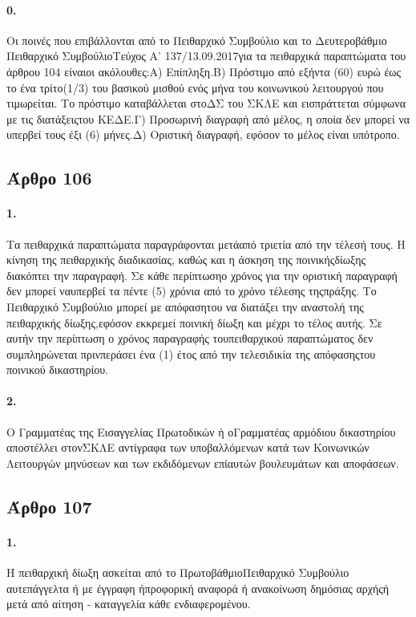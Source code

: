 \documentclass[a4paper,oneside, 10pt]{book}
\begin{document}
\paragraph { 0. } Οι ποινές που επιβάλλονται από το Πειθαρχικό Συμβούλιο και το Δευτεροβάθμιο Πειθαρχικό ΣυμβούλιοΤεύχος Α’ 137/13.09.2017για τα πειθαρχικά παραπτώματα του άρθρου 104 είναιοι ακόλουθες:Α) Επίπληξη.Β) Πρόστιμο από εξήντα (60) ευρώ έως το ένα τρίτο(1/3) του βασικού μισθού ενός μήνα του κοινωνικού λειτουργού που τιμωρείται. Το πρόστιμο καταβάλλεται στοΔΣ του ΣΚΛΕ και εισπράττεται σύμφωνα με τις διατάξειςτου ΚΕΔΕ.Γ) Προσωρινή διαγραφή από μέλος, η οποία δεν μπορεί να υπερβεί τους έξι (6) μήνες.Δ) Οριστική διαγραφή, εφόσον το μέλος είναι υπότροπο.
\subsection*{ Άρθρο 106 }
\paragraph { 1. } Τα πειθαρχικά παραπτώματα παραγράφονται μετάαπό τριετία από την τέλεσή τους. Η κίνηση της πειθαρχικής διαδικασίας, καθώς και η άσκηση της ποινικήςδίωξης διακόπτει την παραγραφή. Σε κάθε περίπτωσηο χρόνος για την οριστική παραγραφή δεν μπορεί ναυπερβεί τα πέντε (5) χρόνια από το χρόνο τέλεσης τηςπράξης. Το Πειθαρχικό Συμβούλιο μπορεί με απόφασητου να διατάξει την αναστολή της πειθαρχικής δίωξης,εφόσον εκκρεμεί ποινική δίωξη και μέχρι το τέλος αυτής. Σε αυτήν την περίπτωση ο χρόνος παραγραφής τουπειθαρχικού παραπτώματος δεν συμπληρώνεται πρινπεράσει ένα (1) έτος από την τελεσιδικία της απόφασηςτου ποινικού δικαστηρίου.
\paragraph { 2. } Ο Γραμματέας της Εισαγγελίας Πρωτοδικών ή οΓραμματέας αρμόδιου δικαστηρίου αποστέλλει στονΣΚΛΕ αντίγραφα των υποβαλλόμενων κατά των Κοινωνικών Λειτουργών μηνύσεων και των εκδιδόμενων επίαυτών βουλευμάτων και αποφάσεων.
\subsection*{ Άρθρο 107 }
\paragraph { 1. } Η πειθαρχική δίωξη ασκείται από το ΠρωτοβάθμιοΠειθαρχικό Συμβούλιο αυτεπάγγελτα ή με έγγραφη ήπροφορική αναφορά ή ανακοίνωση δημόσιας αρχήςή μετά από αίτηση - καταγγελία κάθε ενδιαφερομένου.
\end{document}
